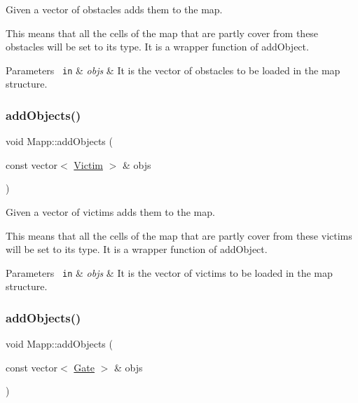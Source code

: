 Given a vector of obstacles adds them to the map. 

This means that all the cells of the map that are partly cover from these obstacles will be set to its type. It is a wrapper function of add\+Object.


\begin{DoxyParams}[1]{Parameters}
\mbox{\texttt{ in}}  & {\em objs} & It is the vector of obstacles to be loaded in the map structure. \\
\hline
\end{DoxyParams}
\mbox{\label{class_mapp_a46385479c68f30deb76adbf9a5cff9c3}} 
\subsubsection{\texorpdfstring{addObjects()}{addObjects()}\hspace{0.1cm}{\footnotesize\ttfamily [3/4]}}
{\footnotesize\ttfamily void Mapp\+::add\+Objects (\begin{DoxyParamCaption}\item[{const vector$<$ \mbox{\hyperlink{class_victim}{Victim}} $>$ \&}]{objs }\end{DoxyParamCaption})}



Given a vector of victims adds them to the map. 

This means that all the cells of the map that are partly cover from these victims will be set to its type. It is a wrapper function of add\+Object.


\begin{DoxyParams}[1]{Parameters}
\mbox{\texttt{ in}}  & {\em objs} & It is the vector of victims to be loaded in the map structure. \\
\hline
\end{DoxyParams}
\mbox{\label{class_mapp_a99b3e0e922c4cd5416343ad7e08d8e72}} 
\subsubsection{\texorpdfstring{addObjects()}{addObjects()}\hspace{0.1cm}{\footnotesize\ttfamily [4/4]}}
{\footnotesize\ttfamily void Mapp\+::add\+Objects (\begin{DoxyParamCaption}\item[{const vector$<$ \mbox{\hyperlink{class_gate}{Gate}} $>$ \&}]{objs }\end{DoxyParamCaption})}



